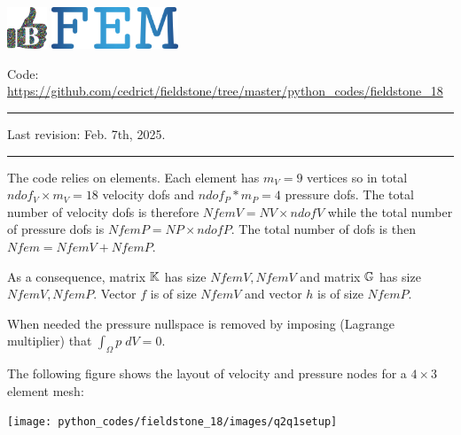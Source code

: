 \includegraphics[height=1.25cm]{images/pictograms/benchmark}
\includegraphics[height=1.25cm]{images/pictograms/FEM}


%

\begin{center}
\inpython
{\small Code: \url{https://github.com/cedrict/fieldstone/tree/master/python_codes/fieldstone_18}}
\end{center}

\par\noindent\rule{\textwidth}{0.4pt}

Last revision: Feb. 7th, 2025.

\par\noindent\rule{\textwidth}{0.4pt}


The code relies on \QtwoQone elements.
Each element has $m_V=9$ vertices so in total $ndof_V\times m_V=18$ velocity dofs and 
$ndof_P*m_P=4$ pressure dofs. The total number of 
velocity dofs is therefore $NfemV=NV \times ndofV$ while the total number of
pressure dofs is $NfemP=NP\times ndofP$. The total number of dofs is then $Nfem=NfemV+NfemP$.

As a consequence, matrix ${\mathbb{K}}$ has size $NfemV,NfemV$ and matrix ${\mathbb{G}}$ has size $NfemV,NfemP$.
Vector $f$ is of size $NfemV$ and vector $h$ is of size $NfemP$.  

When needed the pressure nullspace is removed 
by imposing (Lagrange multiplier) that $\int_\Omega p \; dV=0$.

The following figure shows the layout of velocity and pressure nodes
for a $4\times 3$ element mesh:
\begin{center}
\texttt{[image: python\_codes/fieldstone\_18/images/q2q1setup]}
\end{center}

